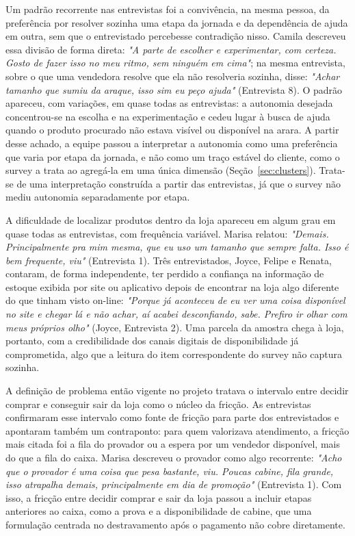Um padrão recorrente nas entrevistas foi a convivência, na mesma pessoa, da preferência por resolver sozinha uma etapa da jornada e da dependência de ajuda em outra, sem que o entrevistado percebesse contradição nisso. Camila descreveu essa divisão de forma direta: \emph{"A parte de escolher e experimentar, com certeza. Gosto de fazer isso no meu ritmo, sem ninguém em cima"}; na mesma entrevista, sobre o que uma vendedora resolve que ela não resolveria sozinha, disse: \emph{"Achar tamanho que sumiu da araque, isso sim eu peço ajuda"} (Entrevista 8). O padrão apareceu, com variações, em quase todas as entrevistas: a autonomia desejada concentrou-se na escolha e na experimentação e cedeu lugar à busca de ajuda quando o produto procurado não estava visível ou disponível na arara. A partir desse achado, a equipe passou a interpretar a autonomia como uma preferência que varia por etapa da jornada, e não como um traço estável do cliente, como o survey a trata ao agregá-la em uma única dimensão (Seção~\ref{sec:clusters}). Trata-se de uma interpretação construída a partir das entrevistas, já que o survey não mediu autonomia separadamente por etapa.

A dificuldade de localizar produtos dentro da loja apareceu em algum grau em quase todas as entrevistas, com frequência variável. Marisa relatou: \emph{"Demais. Principalmente pra mim mesma, que eu uso um tamanho que sempre falta. Isso é bem frequente, viu"} (Entrevista 1). Três entrevistados, Joyce, Felipe e Renata, contaram, de forma independente, ter perdido a confiança na informação de estoque exibida por site ou aplicativo depois de encontrar na loja algo diferente do que tinham visto on-line: \emph{"Porque já aconteceu de eu ver uma coisa disponível no site e chegar lá e não achar, aí acabei desconfiando, sabe. Prefiro ir olhar com meus próprios olho"} (Joyce, Entrevista 2). Uma parcela da amostra chega à loja, portanto, com a credibilidade dos canais digitais de disponibilidade já comprometida, algo que a leitura do item correspondente do survey não captura sozinha.

A definição de problema então vigente no projeto tratava o intervalo entre decidir comprar e conseguir sair da loja como o núcleo da fricção. As entrevistas confirmaram esse intervalo como fonte de fricção para parte dos entrevistados e apontaram também um contraponto: para quem valorizava atendimento, a fricção mais citada foi a fila do provador ou a espera por um vendedor disponível, mais do que a fila do caixa. Marisa descreveu o provador como algo recorrente: \emph{"Acho que o provador é uma coisa que pesa bastante, viu. Poucas cabine, fila grande, isso atrapalha demais, principalmente em dia de promoção"} (Entrevista 1). Com isso, a fricção entre decidir comprar e sair da loja passou a incluir etapas anteriores ao caixa, como a prova e a disponibilidade de cabine, que uma formulação centrada no destravamento após o pagamento não cobre diretamente.

